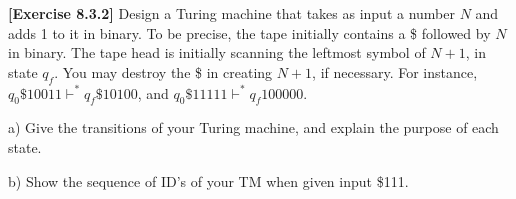 \textbf{[Exercise 8.3.2]} Design a Turing machine that takes as input
a number $N$ and adds 1 to it in binary. To be precise, the tape initially
contains a \$ followed by $N$ in binary. The tape head is initially scanning 
the leftmost symbol of $N+1$, in state $q_f$. You may destroy the \$ in creating
$N+1$, if necessary. For instance, $q_0\$10011\vdash^*q_f\$10100$, and 
$q_0\$11111\vdash^*q_f100000$.

a) Give the transitions of your Turing machine, and explain the purpose of 
each state.

b) Show the sequence of ID's of your TM when given input \$111.
